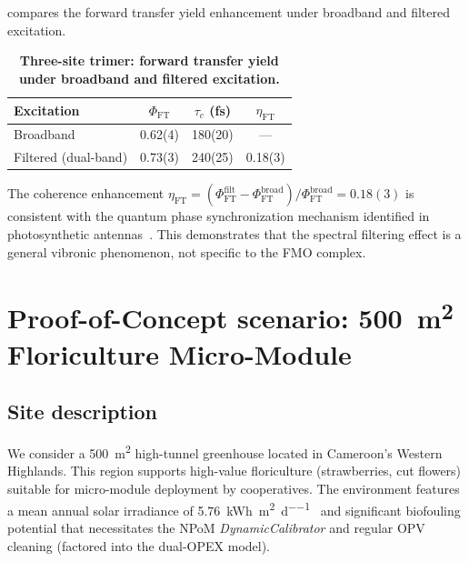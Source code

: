 \documentclass[11pt,a4paper]{article}
\begin{document}
 compares the forward transfer yield enhancement under broadband and filtered excitation.

\begin{table}[htbp]
\centering
\caption{\textbf{Three-site trimer: forward transfer yield under broadband and filtered excitation.}}
\label{tab:SI_trimer_results}
\begin{tabular}{l S[table-format=1.2(1)] S[table-format=3.0(2)] S[table-format=1.2(1)]}
\toprule
Excitation & {$\Phi_{\mathrm{FT}}$} & {$\tau_c$ (fs)} & {$\eta_{\mathrm{FT}}$} \\
\midrule
Broadband & 0.62(4) & 180(20) & {---} \\
Filtered (dual-band) & 0.73(3) & 240(25) & 0.18(3) \\
\bottomrule
\end{tabular}
\end{table}

The coherence enhancement $\eta_{\mathrm{FT}} = (\Phi_{\mathrm{FT}}^{\mathrm{filt}} - \Phi_{\mathrm{FT}}^{\mathrm{broad}}) / \Phi_{\mathrm{FT}}^{\mathrm{broad}} = 0.18(3)$ is consistent with the quantum phase synchronization mechanism identified in photosynthetic antennas~\cite{Zhu2024}.
This demonstrates that the spectral filtering effect is a general vibronic phenomenon, not specific to the FMO complex.


\section{Proof-of-Concept scenario: \texorpdfstring{\qty{500}{\m\squared}}{500 m\texttwosuperior} Floriculture Micro-Module}
\label{SI-sec:poc}

\subsection{Site description}

We consider a \qty{500}{\m\squared} high-tunnel greenhouse located in Cameroon's Western Highlands.
This region supports high-value floriculture (strawberries, cut flowers) suitable for micro-module deployment by cooperatives. The environment features a mean annual solar irradiance of \qty{5.76}{\kWh\per\m\squared\per\day}~\cite{FAO2022} and significant biofouling potential that necessitates the NPoM \textit{DynamicCalibrator} and regular OPV cleaning (factored into the dual-OPEX model).
\end{document}
